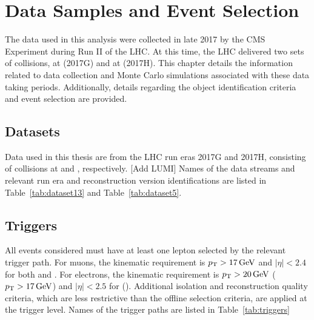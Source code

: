 \chapter{Data Samples and Event Selection}\label{ch:data}
The data used in this analysis were collected in late 2017 by the CMS Experiment during Run II of the LHC. At this time, the LHC delivered two sets of \pp collisions, at \serag (2017G) and at \serah (2017H). This chapter details the information related to data collection and Monte Carlo simulations associated with these data taking periods. Additionally, details regarding the object identification criteria and event selection are provided.



\section{Datasets}\label{ch:data:dataset}
Data used in this thesis are from the LHC run eras 2017G and 2017H, consisting of \pp collisions at \serag and \serah, respectively. [Add LUMI] Names of the data streams and relevant run era and reconstruction version identifications are listed in Table~\ref{tab:dataset13} and Table~\ref{tab:dataset5}. 


\section{Triggers}\label{ch:data:triggers}
All events considered must have at least one lepton selected by the relevant trigger path. For muons, the kinematic requirement is $p_{\mathrm{T}}>17\,\text{Ge\hspace{-.08em}V}$ and $|\eta|<2.4$ for both \serag and \serah. For electrons, the kinematic requirement is $p_{\mathrm{T}}>20\,\text{Ge\hspace{-.08em}V}$ ($p_{\mathrm{T}}>17\,\text{Ge\hspace{-.08em}V}$) and $|\eta|<2.5$ for \serag (\serah). Additional isolation and reconstruction quality criteria, which are less restrictive than the offline selection criteria, are applied at the trigger level. Names of the trigger paths are listed in  Table~\ref{tab:triggers}




